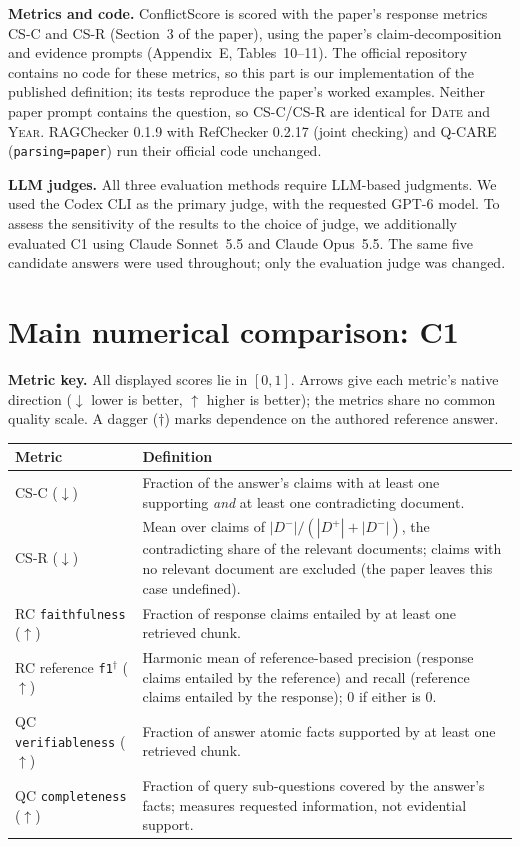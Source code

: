 \documentclass[11pt,a4paper]{article}
\begin{document}
\textbf{Metrics and code.} ConflictScore is scored with the paper's response metrics CS-C and
CS-R (Section~3 of the paper), using the paper's claim-decomposition and evidence prompts
(Appendix~E, Tables~10--11). The official repository contains no code for these metrics, so this part is
our implementation of the published definition; its tests reproduce the paper's worked examples.
Neither paper prompt contains the question, so CS-C/CS-R are identical for \textsc{Date} and \textsc{Year}.
RAGChecker 0.1.9 with RefChecker 0.2.17 (joint checking) and Q-CARE (\texttt{parsing=paper})
run their official code unchanged.

\textbf{LLM judges.} All three evaluation methods require LLM-based judgments. We used the Codex CLI
as the primary judge, with the requested GPT-6 model. To assess the sensitivity of the results to the
choice of judge, we additionally evaluated C1 using Claude Sonnet~5.5 and Claude Opus~5.5. The same five
candidate answers were used throughout; only the evaluation judge was changed.

\section{Main numerical comparison: C1}
\textbf{Metric key.} All displayed scores lie in $[0,1]$. Arrows give each metric's native
direction ($\downarrow$ lower is better, $\uparrow$ higher is better); the metrics share no common
quality scale. A dagger ($\dagger$) marks dependence on the authored reference answer.

{\small
\begin{tabularx}{\linewidth}{@{}p{44mm}L@{}}
\toprule
Metric & Definition \\
\midrule
CS-C ($\downarrow$) & Fraction of the answer's claims with at least one supporting \emph{and} at least one contradicting document. \\
CS-R ($\downarrow$) & Mean over claims of $|D^-|/(|D^+|+|D^-|)$, the contradicting share of the relevant documents; claims with no relevant document are excluded (the paper leaves this case undefined). \\
RC \texttt{faithfulness} ($\uparrow$) & Fraction of response claims entailed by at least one retrieved chunk. \\
RC reference \texttt{f1}$^\dagger$ ($\uparrow$) & Harmonic mean of reference-based precision (response claims entailed by the reference) and recall (reference claims entailed by the response); 0 if either is 0. \\
QC \texttt{verifiableness} ($\uparrow$) & Fraction of answer atomic facts supported by at least one retrieved chunk. \\
QC \texttt{completeness} ($\uparrow$) & Fraction of query sub-questions covered by the answer's facts; measures requested information, not evidential support. \\
\bottomrule
\end{tabularx}}\par\vspace{3pt}
\end{document}
